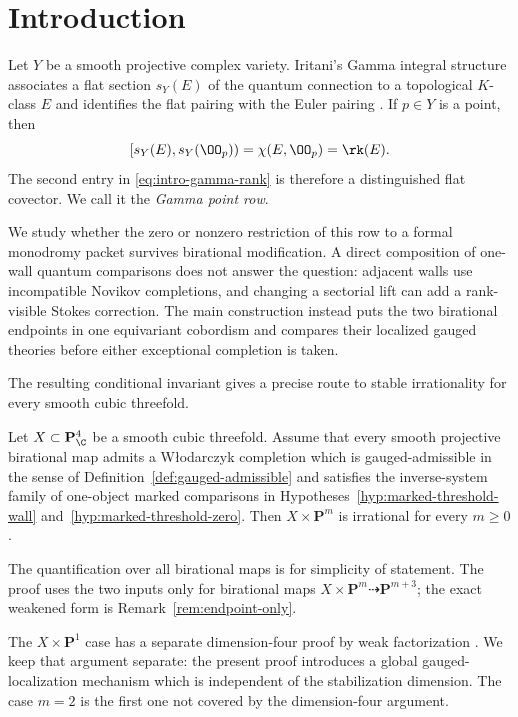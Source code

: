 \section{Introduction}\label{sec:introduction}

Let \(Y\) be a smooth projective complex variety.  Iritani's Gamma integral
structure associates a flat section \(s_Y(E)\) of the quantum connection to a
topological \(K\)-class \(E\) and identifies the flat pairing with the Euler
pairing \cite{IritaniGamma}.  If \(p\in Y\) is a point, then
\begin{equation}\label{eq:intro-gamma-rank}
 [s_Y(E),s_Y(\OO_p))=\chi(E,\OO_p)=\rk(E).
\end{equation}
The second entry in \eqref{eq:intro-gamma-rank} is therefore a distinguished
flat covector.  We
call it the \emph{Gamma point row}.

We study whether the zero or nonzero restriction of this row to a formal
monodromy packet survives birational modification.  A direct composition of
one-wall quantum comparisons does not answer the question: adjacent walls
use incompatible Novikov completions, and changing a sectorial lift can add
a rank-visible Stokes correction.  The main construction instead puts the
two birational endpoints in one equivariant cobordism and compares their
localized gauged theories before either exceptional completion is taken.

The resulting conditional invariant gives a precise route to stable
irrationality for every smooth cubic threefold.

\begin{theorem}
\label{thm:intro-cubic-conditional}
Let \(X\subset\mathbf P^4_{\C}\) be a smooth cubic threefold.  Assume that
every smooth projective birational map admits a W{\l}odarczyk completion
which is gauged-admissible in the sense of
Definition~\ref{def:gauged-admissible} and satisfies the inverse-system
family of one-object marked comparisons in
Hypotheses~\ref{hyp:marked-threshold-wall}
and~\ref{hyp:marked-threshold-zero}.  Then
\(X\times\mathbf P^m\) is irrational for every \(m\geq0\).
\end{theorem}

The quantification over all birational maps is for simplicity of statement.
The proof uses the two inputs only for birational maps
\(X\times\mathbf P^m\dashrightarrow\mathbf P^{m+3}\); the exact weakened
form is Remark~\ref{rem:endpoint-only}.

The \(X\times\mathbf P^1\) case has a separate
dimension-four proof by weak factorization \cite{RuddEpilogue}.  We keep that
argument separate: the present proof introduces a global gauged-localization
mechanism which is independent of the stabilization dimension.  The case
\(m=2\) is the first one not covered by the dimension-four argument.

